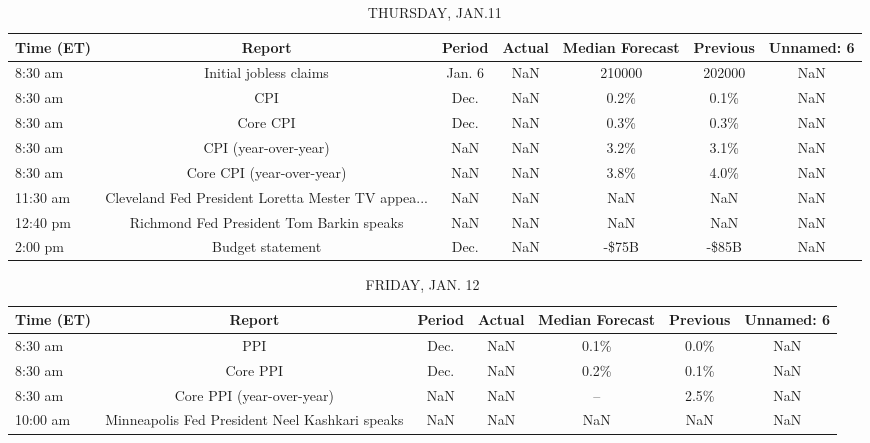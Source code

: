 \documentclass{article}%
\begin{document}
%


\begin{table}[htbp]%
\caption{THURSDAY, JAN.11}%
\centering%
\begin{adjustbox}{width=1\textwidth}%
\begin{tabular}{lcccccc}
\toprule
Time (ET) &                                             Report & Period & Actual & Median Forecast & Previous & Unnamed: 6 \\
\midrule
  8:30 am &                             Initial jobless claims & Jan. 6 &    NaN &          210000 &   202000 &        NaN \\
  8:30 am &                                                CPI &   Dec. &    NaN &            0.2\% &     0.1\% &        NaN \\
  8:30 am &                                           Core CPI &   Dec. &    NaN &            0.3\% &     0.3\% &        NaN \\
  8:30 am &                               CPI (year-over-year) &    NaN &    NaN &            3.2\% &     3.1\% &        NaN \\
  8:30 am &                          Core CPI (year-over-year) &    NaN &    NaN &            3.8\% &     4.0\% &        NaN \\
 11:30 am & Cleveland Fed President Loretta Mester TV appea... &    NaN &    NaN &             NaN &      NaN &        NaN \\
 12:40 pm &           Richmond Fed President Tom Barkin speaks &    NaN &    NaN &             NaN &      NaN &        NaN \\
  2:00 pm &                                   Budget statement &   Dec. &    NaN &           -\$75B &    -\$85B &        NaN \\
\bottomrule
\end{tabular}
%
\end{adjustbox}%
\end{table}

%


\begin{table}[htbp]%
\caption{FRIDAY, JAN. 12}%
\centering%
\begin{adjustbox}{width=1\textwidth}%
\begin{tabular}{lcccccc}
\toprule
Time (ET) &                                         Report & Period & Actual & Median Forecast & Previous & Unnamed: 6 \\
\midrule
  8:30 am &                                            PPI &   Dec. &    NaN &            0.1\% &     0.0\% &        NaN \\
  8:30 am &                                       Core PPI &   Dec. &    NaN &            0.2\% &     0.1\% &        NaN \\
  8:30 am &                      Core PPI (year-over-year) &    NaN &    NaN &              -- &     2.5\% &        NaN \\
 10:00 am & Minneapolis Fed President Neel Kashkari speaks &    NaN &    NaN &             NaN &      NaN &        NaN \\
\bottomrule
\end{tabular}
%
\end{adjustbox}%
\end{table}
\end{document}
